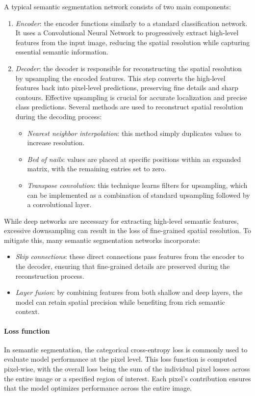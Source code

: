 A typical semantic segmentation network consists of two main components:
\begin{enumerate}
    \item \textit{Encoder}: the encoder functions similarly to a standard classification network. 
        It uses a Convolutional Neural Network to progressively extract high-level features from the input image, reducing the spatial resolution while capturing essential semantic information.
    \item \textit{Decoder}: the decoder is responsible for reconstructing the spatial resolution by upsampling the encoded features. 
        This step converts the high-level features back into pixel-level predictions, preserving fine details and sharp contours. 
        Effective upsampling is crucial for accurate localization and precise class predictions. 
        Several methods are used to reconstruct spatial resolution during the decoding process: 
        \begin{itemize} 
            \item \textit{Nearest neighbor interpolation}: this method simply duplicates values to increase resolution. 
            \item \textit{Bed of nails}: values are placed at specific positions within an expanded matrix, with the remaining entries set to zero. 
        \item \textit{Transpose convolution}: this technique learns filters for upsampling, which can be implemented as a combination of standard upsampling followed by a convolutional layer. 
        \end{itemize} 
\end{enumerate}
While deep networks are necessary for extracting high-level semantic features, excessive downsampling can result in the loss of fine-grained spatial resolution. 
To mitigate this, many semantic segmentation networks incorporate: 
\begin{itemize} 
    \item \textit{Skip connections}: these direct connections pass features from the encoder to the decoder, ensuring that fine-grained details are preserved during the reconstruction process. 
    \item \textit{Layer fusion}: by combining features from both shallow and deep layers, the model can retain spatial precision while benefiting from rich semantic context. 
\end{itemize}

\paragraph*{Loss function}
In semantic segmentation, the categorical cross-entropy loss is commonly used to evaluate model performance at the pixel level. 
This loss function is computed pixel-wise, with the overall loss being the sum of the individual pixel losses across the entire image or a specified region of interest. 
Each pixel's contribution ensures that the model optimizes performance across the entire image.

